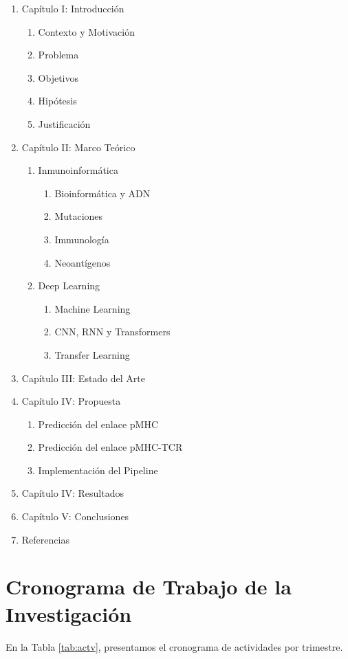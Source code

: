 \documentclass[a4paper]{article}
\begin{document}
\begin{enumerate}
	\item Capítulo I: Introducción
	\begin{enumerate}
		\item Contexto y Motivación
		\item Problema
		\item Objetivos
		\item Hipótesis
		\item Justificación
	\end{enumerate}
	\item Capítulo II: Marco Teórico
	\begin{enumerate}
		\item Inmunoinformática
		\begin{enumerate}
			\item Bioinformática y ADN
			\item Mutaciones
			\item Immunología
			\item Neoantígenos
		\end{enumerate}
		
		\item Deep Learning
		\begin{enumerate}
			\item Machine Learning
			\item CNN, RNN y Transformers
			\item Transfer Learning
		\end{enumerate}		
	\end{enumerate}
	
	\item Capítulo III: Estado del Arte
	\item Capítulo IV: Propuesta
	\begin{enumerate}
		\item Predicción del enlace pMHC
		\item Predicción del enlace pMHC-TCR
		\item Implementación del Pipeline		
	\end{enumerate}
	
	\item Capítulo IV: Resultados
	\item Capítulo V: Conclusiones
	\item Referencias
\end{enumerate}

\section{Cronograma de Trabajo de la Investigación}
En la Tabla \ref{tab:actv}, presentamos el cronograma de actividades por trimestre.
\end{document}
